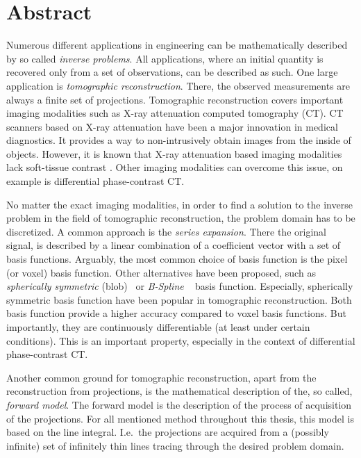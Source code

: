 \chapter*{Abstract}

\noindent%
Numerous different applications in engineering can be mathematically described by so called
\textit{inverse problems}. All applications, where an initial quantity is recovered only from a set
of observations, can be described as such. One large application is \textit{tomographic
	reconstruction}. There, the observed measurements are always a finite set of projections.
Tomographic reconstruction covers important imaging modalities such as X-ray attenuation computed
tomography (CT). CT scanners based on X-ray attenuation have been a major innovation in medical
diagnostics. It provides a way to non-intrusively obtain images from the inside of objects. However,
it is known that X-ray attenuation based imaging modalities lack soft-tissue contrast
\cite{pfeiffer_phase_2006}. Other imaging modalities can overcome this issue, on example is
differential phase-contrast CT.

No matter the exact imaging modalities, in order to find a solution to the inverse problem in the
field of tomographic reconstruction, the problem domain has to be discretized. A common approach is
the \textit{series expansion}. There the original signal, is described by a linear combination of a
coefficient vector with a set of basis functions. Arguably, the most common choice of basis function
is the pixel (or voxel) basis function. Other alternatives have been proposed, such as
\textit{spherically symmetric} (blob)~\cite{lewitt_multidimensional_1990} or \textit{B-Spline}
~\cite{unser_fast_1991} basis function. Especially, spherically symmetric basis function have been
popular in tomographic reconstruction. Both basis function provide a higher accuracy compared to
voxel basis functions. But importantly, they are continuously differentiable (at least under certain
conditions). This is an important property, especially in the context of differential phase-contrast
CT\@.

Another common ground for tomographic reconstruction, apart from the reconstruction from
projections, is the mathematical description of the, so called, \textit{forward model}. The forward
model is the description of the process of acquisition of the projections. For all mentioned method
throughout this thesis, this model is based on the line integral. I.e.\ the projections are acquired
from a (possibly infinite) set of infinitely thin lines tracing through the desired problem domain.

